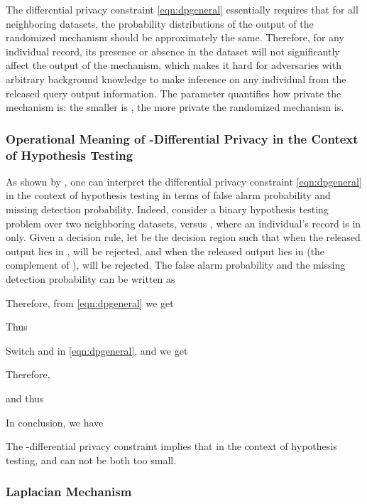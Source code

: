 The differential privacy constraint \eqref{eqn:dpgeneral} essentially requires that for all neighboring datasets, the probability distributions of the output of the randomized mechanism should be approximately the same. Therefore, for any individual record, its presence or absence in the dataset will not significantly affect the output of the mechanism, which makes it hard for adversaries with arbitrary background knowledge to make inference on any individual from the released query output information. The parameter  quantifies how private the mechanism is: the smaller  is , the more private the randomized mechanism is.






\subsubsection{Operational Meaning of -Differential Privacy in the Context of Hypothesis Testing}


As shown by \cite{Zhou08}, one can interpret the   differential privacy constraint  \eqref{eqn:dpgeneral} in the context of hypothesis testing in terms of false alarm probability and missing detection probability. Indeed, consider a binary hypothesis testing problem over two neighboring datasets,  versus , where an individual's record is in  only. Given a decision rule, let  be the decision region such that when the released output lies in ,  will be rejected, and when the released output lies in  (the complement of ),  will be rejected. The false alarm probability  and the missing detection probability  can be written as


Therefore, from \eqref{eqn:dpgeneral} we get

Thus


Switch  and  in \eqref{eqn:dpgeneral}, and we get
	

Therefore,

and thus


In conclusion,  we have


The -differential privacy constraint implies that in the context of hypothesis testing,   and  can not be both too small.











\subsubsection{Laplacian Mechanism}



